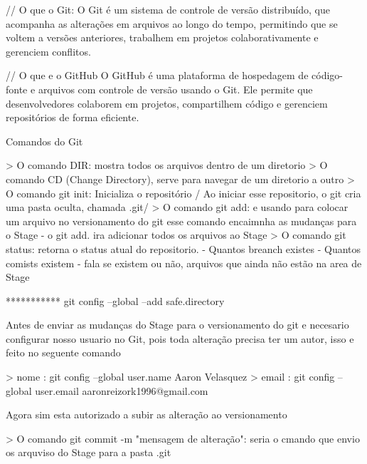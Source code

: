 // O que o Git:
O Git é um sistema de controle de versão distribuído, que acompanha as alterações em arquivos ao longo do tempo, 
permitindo que se voltem a versões anteriores, trabalhem em projetos colaborativamente e gerenciem conflitos.

// O que e o GitHub
O GitHub é uma plataforma de hospedagem de código-fonte e arquivos com controle de versão usando o Git. 
Ele permite que desenvolvedores colaborem em projetos, compartilhem código e gerenciem repositórios de forma eficiente.


Comandos do Git 

> O comando DIR: mostra todos os arquivos dentro de um diretorio
> O comando CD (Change Directory), serve para navegar de um diretorio a outro
> O comando git init: Inicializa o repositório / Ao iniciar esse repositorio, o git
    cria uma pasta oculta, chamada .git/
> O comando git add:  e usando para colocar um arquivo no versionamento do git
    esse comando encaimnha as mudanças para o Stage
    - o git add. ira adicionar todos os arquivos ao Stage 
> O comando git status: retorna o status atual do repositorio. 
    - Quantos breanch existes
    - Quantos comists existem
    - fala se existem ou não, arquivos que ainda não estão na area de Stage

   *********** git config --global --add safe.directory

Antes de enviar as mudanças do Stage para o versionamento do git e necesario configurar nosso
usuario no Git, pois toda alteração precisa ter um autor, isso e feito no seguente comando

> nome : git config --global user.name Aaron Velasquez
> email : git config --global user.email aaronreizork1996@gmail.com

Agora sim esta autorizado a subir as alteração ao versionamento

> O comando git commit -m "mensagem de alteração": seria  o cmando que envio os arquviso do Stage para a pasta .git


 